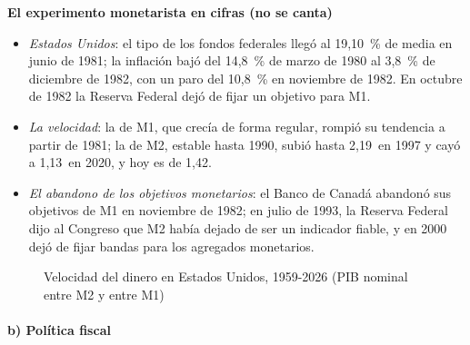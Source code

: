 \documentclass[11pt]{article}
\begin{document}
\begin{anotaciones}
\textbf{El experimento monetarista en cifras (no se canta)}
\begin{itemize}
\item \emph{Estados Unidos}: el tipo de los fondos federales llegó al 19,10~\% de media en junio de 1981\nocite{FRED2026FondosFederales}; la inflación bajó del 14,8~\% de marzo de 1980 al 3,8~\% de diciembre de 1982, con un paro del 10,8~\% en noviembre de 1982\nocite{BLS2026IPC,BLS2026UNRATE}. En octubre de 1982 la Reserva Federal dejó de fijar un objetivo para M1\nocite{Thornton2006When}.
\item \emph{La velocidad}: la de M1, que crecía de forma regular, rompió su tendencia a partir de 1981; la de M2, estable hasta 1990, subió hasta 2,19~en 1997 y cayó a 1,13~en 2020, y hoy es de 1,42\nocite{FRED2026Velocidad}.
\item \emph{El abandono de los objetivos monetarios}: el Banco de Canadá abandonó sus objetivos de M1 en noviembre de 1982\nocite{Bouey1982Statement}; en julio de 1993, la Reserva Federal dijo al Congreso que M2 había dejado de ser un indicador fiable\nocite{Greenspan1993Testimony}, y en 2000 dejó de fijar bandas para los agregados monetarios\nocite{Fed2000MPR}.
\end{itemize}
\end{anotaciones}

\begin{figure}[H]
\centering
\caption{Velocidad del dinero en Estados Unidos, 1959-2026 (PIB nominal entre M2 y entre M1)}\label{fig:velocidad}
\end{figure}

\paragraph{b) Política fiscal}\label{sec:politica-fiscal}
\end{document}
